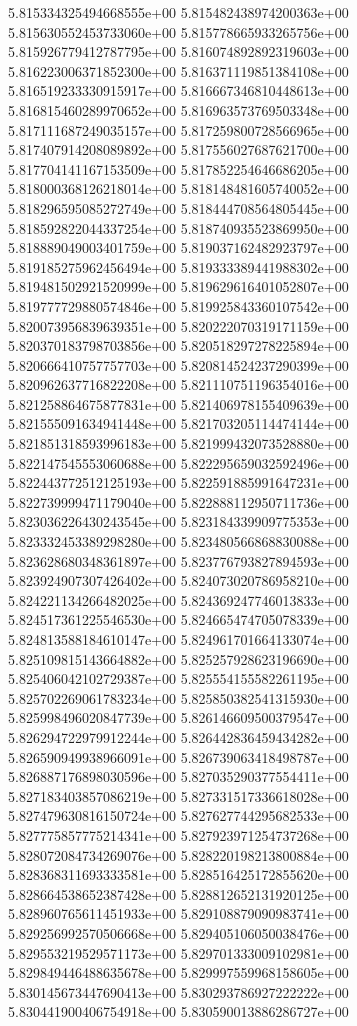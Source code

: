 5.815334325494668555e+00
5.815482438974200363e+00
5.815630552453733060e+00
5.815778665933265756e+00
5.815926779412787795e+00
5.816074892892319603e+00
5.816223006371852300e+00
5.816371119851384108e+00
5.816519233330915917e+00
5.816667346810448613e+00
5.816815460289970652e+00
5.816963573769503348e+00
5.817111687249035157e+00
5.817259800728566965e+00
5.817407914208089892e+00
5.817556027687621700e+00
5.817704141167153509e+00
5.817852254646686205e+00
5.818000368126218014e+00
5.818148481605740052e+00
5.818296595085272749e+00
5.818444708564805445e+00
5.818592822044337254e+00
5.818740935523869950e+00
5.818889049003401759e+00
5.819037162482923797e+00
5.819185275962456494e+00
5.819333389441988302e+00
5.819481502921520999e+00
5.819629616401052807e+00
5.819777729880574846e+00
5.819925843360107542e+00
5.820073956839639351e+00
5.820222070319171159e+00
5.820370183798703856e+00
5.820518297278225894e+00
5.820666410757757703e+00
5.820814524237290399e+00
5.820962637716822208e+00
5.821110751196354016e+00
5.821258864675877831e+00
5.821406978155409639e+00
5.821555091634941448e+00
5.821703205114474144e+00
5.821851318593996183e+00
5.821999432073528880e+00
5.822147545553060688e+00
5.822295659032592496e+00
5.822443772512125193e+00
5.822591885991647231e+00
5.822739999471179040e+00
5.822888112950711736e+00
5.823036226430243545e+00
5.823184339909775353e+00
5.823332453389298280e+00
5.823480566868830088e+00
5.823628680348361897e+00
5.823776793827894593e+00
5.823924907307426402e+00
5.824073020786958210e+00
5.824221134266482025e+00
5.824369247746013833e+00
5.824517361225546530e+00
5.824665474705078339e+00
5.824813588184610147e+00
5.824961701664133074e+00
5.825109815143664882e+00
5.825257928623196690e+00
5.825406042102729387e+00
5.825554155582261195e+00
5.825702269061783234e+00
5.825850382541315930e+00
5.825998496020847739e+00
5.826146609500379547e+00
5.826294722979912244e+00
5.826442836459434282e+00
5.826590949938966091e+00
5.826739063418498787e+00
5.826887176898030596e+00
5.827035290377554411e+00
5.827183403857086219e+00
5.827331517336618028e+00
5.827479630816150724e+00
5.827627744295682533e+00
5.827775857775214341e+00
5.827923971254737268e+00
5.828072084734269076e+00
5.828220198213800884e+00
5.828368311693333581e+00
5.828516425172855620e+00
5.828664538652387428e+00
5.828812652131920125e+00
5.828960765611451933e+00
5.829108879090983741e+00
5.829256992570506668e+00
5.829405106050038476e+00
5.829553219529571173e+00
5.829701333009102981e+00
5.829849446488635678e+00
5.829997559968158605e+00
5.830145673447690413e+00
5.830293786927222222e+00
5.830441900406754918e+00
5.830590013886286727e+00
